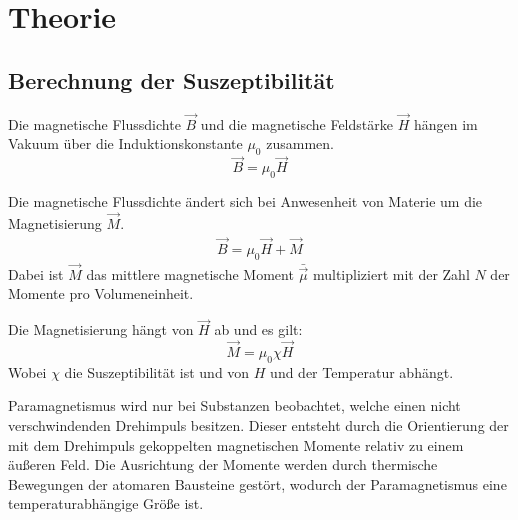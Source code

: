\section{Theorie}
\label{sec:Theorie}


\subsection{Berechnung der Suszeptibilität}
Die magnetische Flussdichte $\vec{B}$ und die magnetische Feldstärke $\vec{H}$ hängen im Vakuum über die
Induktionskonstante $\mu_0$ zusammen.
\begin{equation}
  \vec{B} = \mu_0 \vec{H}
\end{equation}

Die magnetische Flussdichte ändert sich bei Anwesenheit von Materie um die Magnetisierung $\vec{M}$.
\begin{align}
  \vec{B} = \mu_0 \vec{H} + \vec{M}
\end{align}
Dabei ist $\vec{M}$ das mittlere magnetische Moment $\bar{\vec{\mu}}$ multipliziert mit der Zahl $N$ der Momente pro
Volumeneinheit.

Die Magnetisierung hängt von $\vec{H}$ ab und es gilt:
\begin{equation}
  \vec{M} = \mu_0 \chi \vec{H}
\end{equation}
Wobei $\chi$ die Suszeptibilität ist und von $H$ und der Temperatur abhängt.

Paramagnetismus wird nur bei Substanzen beobachtet, welche einen nicht verschwindenden Drehimpuls besitzen.
Dieser entsteht durch die Orientierung der mit dem Drehimpuls gekoppelten magnetischen
Momente relativ zu einem äußeren Feld. Die Ausrichtung der Momente werden durch thermische Bewegungen
der atomaren Bausteine gestört, wodurch der Paramagnetismus eine temperaturabhängige Größe ist.

%
%

